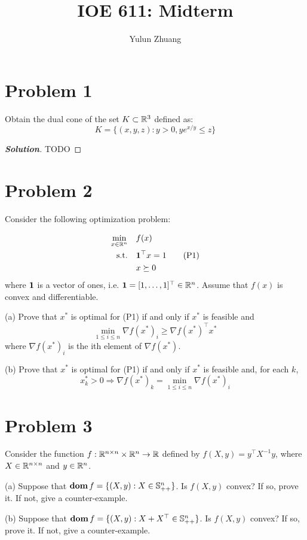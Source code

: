 \documentclass[11pt]{article}
\newenvironment{solution}
  {\renewcommand\qedsymbol{$\square$}\begin{proof}[\textbf{Solution}]}
  {\end{proof}}
\newcommand{\grad}{\nabla}
\newcommand{\T}{^\top}
\begin{document}
\title{IOE 611: Midterm}
\author{Yulun Zhuang}
\maketitle
\section*{Problem 1}
Obtain the dual cone of the set $K \subset {{\mathbb{R}}}^3$ defined as:
\[
K = \{(x, y, z):y>0, ye^{x/y} \leq z\}
\]

\begin{solution}
    TODO
\end{solution}



\clearpage
\section*{Problem 2}
Consider the following optimization problem:

\begin{align}
    \min_{x\in\real^n}\quad &f(x)\notag\\
    \text{s.t.}\quad 
    &\ones\T x = 1\tag{P1}\\
    &x\succeq 0\notag
\end{align}
where $\mathbf 1$ is a vector of ones, i.e. $\ones = [1, \dots, 1]\T\in\real^n$. Assume that $f(x)$ is convex and differentiable.

(a) Prove that $x^*$ is optimal for (P1) if and only if $x^*$ is feasible and
\[
\min_{1\leq i \leq n} \grad f(x^*)_i \geq \grad f(x^*)\T x^*
\]
where $\grad f(x^*)_i$ is the ith element of $\grad f(x^*)$.

(b) Prove that $x^*$ is optimal for (P1) if and only if $x^*$ is feasible and, for each $k$,
\[
x_k^* > 0 \Rightarrow \grad f(x^*)_k = \min_{1\leq i\leq n}\grad f(x^*)_i
\]

\clearpage
\section*{Problem 3}
Consider the function $f:{{\mathbb{R}}}^{n \times n}\times {{\mathbb{R}}}^n \rightarrow {{\mathbb{R}}}$ defined by $f(X, y) = y\T X^{-1}y$, where $X\in {{\mathbb{R}}}^{n\times n}$ and $y\in{{\mathbb{R}}}^n$.

(a) Suppose that $\mathop{\textbf{dom}} f=\{(X, y) : X\in{{\mathbb{S}}}^n_{++}\}$. Is $f(X, y)$ convex? If so, prove it. If not, give a counter-example.

(b) Suppose that $\dom f=\{(X, y): X+X\T \in\symm^n_{++}\}$. Is $f(X, y)$ convex? If so, prove it. If not, give a counter-example.
\end{document}
